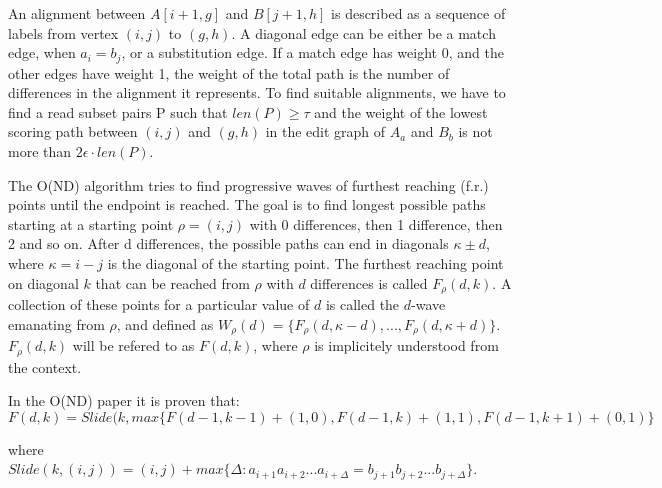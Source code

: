 \documentclass[../main/thesis.tex]{subfiles}
\begin{document}

An alignment between $A[i+1,g]$ and $B[j+1,h]$ is described as a sequence of labels from vertex $(i,j)$ to $(g,h)$.
A diagonal edge can be either be a match edge, when $a_i = b_j$, or a substitution edge.
If a match edge has weight 0, and the other edges have weight 1, the weight of the total path is the number of differences in the alignment it represents.
To find suitable alignments, we have to find a read subset pairs P such that $len(P)\ge \tau$ and the weight of the lowest scoring path between $(i,j)$ and $(g,h)$ in the edit graph of $A_a$ and $B_b$ is not more than $2\epsilon\cdot len(P)$.


The O(ND) algorithm tries to find progressive waves of furthest reaching (f.r.) points until the endpoint is reached.
The goal is to find longest possible paths starting at a starting point $\rho = (i,j)$ with 0 differences, then 1 difference, then 2 and so on.
After d differences, the possible paths can end in diagonals $\kappa \pm d$, where $\kappa = i-j$ is the diagonal of the starting point.
The furthest reaching point on diagonal $k$ that can be reached from $\rho$ with $d$ differences is called $F_\rho(d,k)$.
A collection of these points for a particular value of $d$ is called the $d$-wave emanating from $\rho$, and defined as $W_\rho(d) = \{F_\rho(d,\kappa-d),...,F_\rho(d,\kappa+d)\}$.
$F_\rho(d,k)$ will be refered to as $F(d,k)$, where $\rho$ is implicitely understood from the context.

In the O(ND) paper it is proven that:
\begin{equation}
F(d,k)=Slide(k, max\{F(d-1,k-1)+(1,0), F(d-1,k)+(1,1), F(d-1,k+1)+(0,1)\}
\end{equation}

where $Slide(k,(i,j)) = (i,j) + max\{\Delta:a_{i+1}a_{i+2}...a_{i+\Delta} = b_{j+1}b_{j+2}...b_{j+\Delta}\}$.
\end{document}
